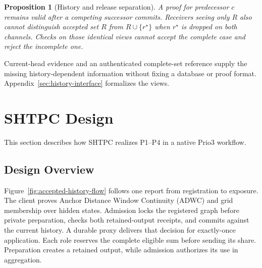 \documentclass[conference,compsoc]{IEEEtran}
\theoremstyle{definition}
\numberwithin{equation}{section}
\numberwithin{table}{section}
\numberwithin{figure}{section}
\theoremstyle{plain}
\newtheorem{proposition}{Proposition}[section]
\newtheorem{proposition}{Proposition}
\begin{document}
\begin{proposition}[History and release separation]
\label{thm:interface-separation-main}
\label{sec:interface-necessity}
A proof for predecessor \(c\) remains valid after a competing successor
commits. Receivers seeing only \(R\) also cannot distinguish accepted set
\(R\) from \(R\cup\{r^\star\}\) when \(r^\star\) is dropped on both channels.
Checks on those identical views cannot accept the complete case and reject
the incomplete one.
\end{proposition}
Current-head evidence and an authenticated complete-set reference supply the
missing history-dependent information without fixing a database or proof
format. Appendix~\ref{sec:history-interface} formalizes the views.

\section{SHTPC Design}
\label{sec:system}

This section describes how SHTPC realizes P1--P4 in a native Prio3 workflow.
\subsection{Design Overview}
\label{sec:architecture-choice}
\label{sec:overview}

Figure~\ref{fig:accepted-history-flow} follows one report from registration
to exposure. The client proves Anchor Distance Window Continuity (ADWC) and
grid membership over hidden states. Admission locks the registered graph before
private preparation, checks both retained-output receipts, and commits against
the current history. A durable proxy delivers that decision for exactly-once
application. Each role reserves the complete eligible sum before sending its
share. Preparation creates a retained output, while admission authorizes its
use in aggregation.
\end{document}
